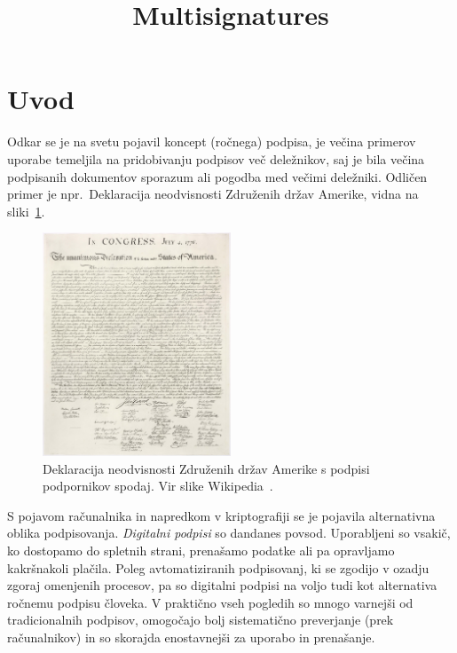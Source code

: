 \documentclass[isrm2, tisk]{fmfdelo}
\title{Multisignatures}
\begin{document}
\section{Uvod}
Odkar se je na svetu pojavil koncept (ročnega) podpisa, je večina primerov uporabe temeljila na
pridobivanju podpisov več deležnikov, saj je bila večina podpisanih dokumentov sporazum ali pogodba
med večimi deležniki. Odličen primer je npr.\ Deklaracija neodvisnosti Združenih držav
Amerike, vidna na sliki~\ref{fig:declaration}. 

\begin{figure}[ht]
  \centering
  \includegraphics[width=0.5\textwidth]{images/declaration.jpg}
  \caption[Deklaracija neodvisnosti Združenih držav Amerike.]{Deklaracija neodvisnosti Združenih 
  držav Amerike s podpisi podpornikov spodaj. Vir slike Wikipedia~\cite{doi}.}
  \label{fig:declaration}
\end{figure}

S pojavom računalnika in napredkom v kriptografiji se je pojavila alternativna oblika podpisovanja.
\textit{Digitalni podpisi} so dandanes povsod. Uporabljeni so vsakič, ko dostopamo do spletnih
strani, prenašamo podatke ali pa opravljamo kakršnakoli plačila. Poleg avtomatiziranih podpisovanj,
ki se zgodijo v ozadju zgoraj omenjenih procesov, pa so digitalni podpisi na voljo tudi kot alternativa
ročnemu podpisu človeka. V praktično vseh pogledih so mnogo varnejši od tradicionalnih podpisov,
omogočajo bolj sistematično preverjanje (prek računalnikov) in so skorajda enostavnejši za uporabo
in prenašanje.
\end{document}
